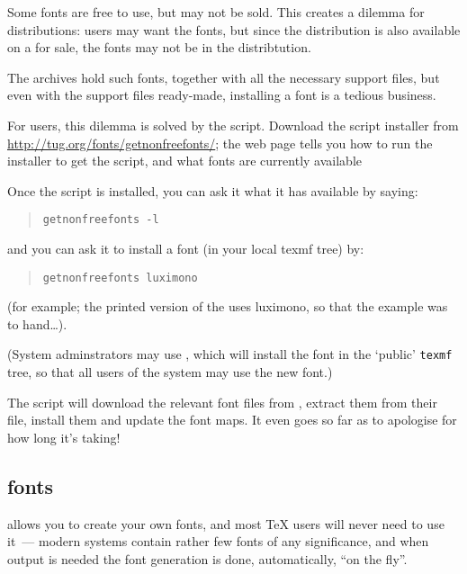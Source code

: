 
Some fonts are free to use, but may not be sold.  This creates a
dilemma for distributions: users may want the fonts, but since the
distribution is also available on a  for sale, the fonts may
not be in the distribtution.

The  archives hold such fonts, together with all the
necessary support files, but even with the support files ready-made,
installing a font is a tedious business.

For \texlive{} users, this dilemma is solved by the
 script.  Download the script installer from
\url{http://tug.org/fonts/getnonfreefonts/}; the web page tells you
how to run the installer to get the script, and what fonts are
currently available

Once the script is installed, you can ask it what it has available by
saying:
\begin{quote}
\begin{verbatim}
getnonfreefonts -l
\end{verbatim}
\end{quote}
and you can ask it to install a font (in your local texmf tree) by:
\begin{quote}
\begin{verbatim}
getnonfreefonts luximono
\end{verbatim}
\end{quote}
(for example; the printed version of the  uses luximono, so
that the example was to hand\dots{}).

(System adminstrators may use , which
will install the font in the `public' \texttt{texmf} tree, so that all
users of the system may use the new font.)

The script will download the relevant font files from ,
extract them from their  file, install them and update
the font maps.  It even goes so far as to apologise for how long it's
taking!

\subsection{\MF{} fonts}


\MF{} allows you to create your own fonts, and most \TeX{} users
will never need to use it~--- modern \AllTeX{} systems contain
rather few \MF{} fonts of any significance, and when \MF{} output is
needed the font generation is done, automatically, ``on the fly''.

